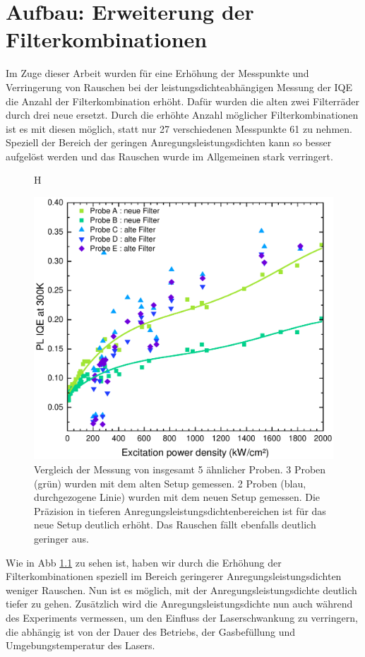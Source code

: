 \chapter{Aufbau: Erweiterung der Filterkombinationen}
\thispagestyle{fancy}

Im Zuge dieser Arbeit wurden für eine Erhöhung der Messpunkte und Verringerung von Rauschen bei der leistungsdichteabhängigen Messung der IQE die Anzahl der Filterkombination erhöht. Dafür wurden die alten zwei Filterräder durch drei neue ersetzt. 
Durch die erhöhte Anzahl möglicher Filterkombinationen ist es mit diesen möglich, statt nur 27 verschiedenen Messpunkte 61 zu nehmen. Speziell der Bereich der geringen Anregungsleistungsdichten kann so besser aufgelöst werden und das Rauschen wurde im Allgemeinen stark verringert. 
%
\begin{figure}{H}
    \centering
    \begin{minipage}[t]{0.49\linewidth}
    \centering
        \includegraphics{Bilder/AuswertungNovemeberKorr1VergleichFilter.pdf}
        \caption{Vergleich der Messung von insgesamt 5 ähnlicher Proben. 3 Proben (grün) wurden mit dem alten Setup gemessen. 2 Proben (blau, durchgezogene Linie) wurden mit dem neuen Setup gemessen. Die Präzision in tieferen Anregungsleistungsdichtenbereichen ist für das neue Setup deutlich erhöht. Das Rauschen fällt ebenfalls deutlich geringer aus. }
        \label{fig:vergleichFilter}
    \end{minipage}
\end{figure}
%
Wie in Abb \ref{fig:vergleichFilter} zu sehen ist, haben wir durch die Erhöhung der Filterkombinationen speziell im Bereich geringerer Anregungsleistungsdichten weniger Rauschen. Nun ist es möglich, mit der Anregungsleistungsdichte deutlich tiefer zu gehen. Zusätzlich wird die Anregungsleistungsdichte nun auch während des Experiments vermessen, um den Einfluss der Laserschwankung zu verringern, die abhängig ist von der Dauer des Betriebs, der Gasbefüllung und Umgebungstemperatur des Lasers. 
